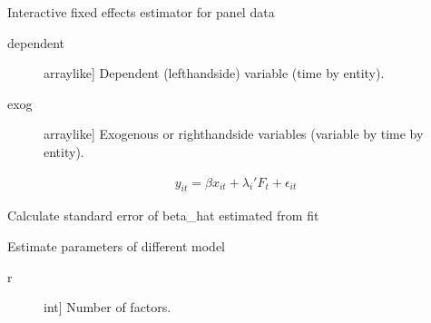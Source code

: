 \documentclass[a4paper,11pt,english]{sphinxmanual}
\begin{document}
\begin{fulllineitems}
\label{\detokenize{model_code:src.model_code.interactive_fixed_effect.InteractiveFixedEffect}}
\sphinxAtStartPar
Interactive fixed effects estimator for panel data
\begin{description}
\item[{dependent}] \leavevmode{[}array\sphinxhyphen{}like{]}
\sphinxAtStartPar
Dependent (left\sphinxhyphen{}hand\sphinxhyphen{}side) variable (time by entity).

\item[{exog}] \leavevmode{[}array\sphinxhyphen{}like{]}
\sphinxAtStartPar
Exogenous or right\sphinxhyphen{}hand\sphinxhyphen{}side variables (variable by time by entity).

\end{description}
\begin{equation*}
\begin{split}y_{it} = \beta x_{it} + \lambda_{i}'F_{t} + \epsilon_{it}\end{split}
\end{equation*}

\begin{fulllineitems}
\label{\detokenize{model_code:src.model_code.interactive_fixed_effect.InteractiveFixedEffect.calculate_sde}}
\sphinxAtStartPar
Calculate standard error of beta\_hat estimated from fit

\end{fulllineitems}


\begin{fulllineitems}
\label{\detokenize{model_code:src.model_code.interactive_fixed_effect.InteractiveFixedEffect.fit}}
\sphinxAtStartPar
Estimate parameters of different model
\begin{description}
\item[{r}] \leavevmode{[}int{]}
\sphinxAtStartPar
Number of factors.


\end{description}
\end{fulllineitems}
\end{fulllineitems}
\end{document}
